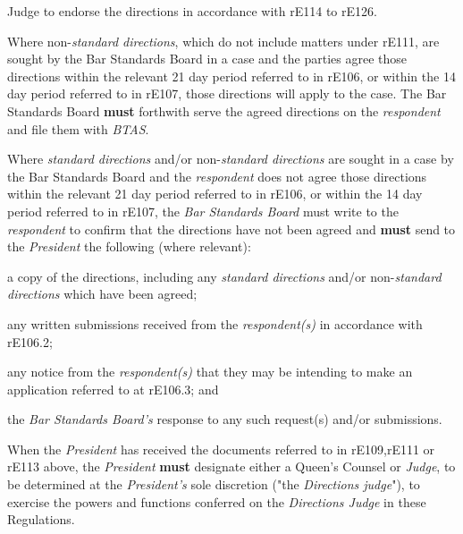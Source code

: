 Judge to endorse the directions in accordance with rE114 to rE126.\\
\par
Where non-\emph{standard directions}, which do not include matters under
rE111, are sought by the Bar Standards Board in a case and the parties
agree those directions within the relevant 21 day period referred to in
rE106, or within the 14 day period referred to in rE107, those
directions will apply to the case. The Bar Standards Board  \textcolor{myred}{\textbf{must}}
forthwith serve the agreed directions on the \emph{respondent} and file
them with \emph{BTAS}.\\
\par
{}
Where \emph{standard directions} and/or non-\emph{standard
directions} are sought in a case by the Bar Standards Board and
the \emph{respondent} does not agree those directions within the
relevant 21 day period referred to in rE106, or within the 14 day period
referred to in rE107, the \emph{Bar Standards Board }must write to
the \emph{respondent} to confirm that the directions have not been
agreed and  \textcolor{myred}{\textbf{must}} send to the \emph{President} the following (where
relevant):\\\nl \item a copy of the directions, including any \emph{standard
directions} and/or non-\emph{standard directions} which have been
agreed;\item any written submissions received from the \emph{respondent(s)} in
accordance with rE106.2;\item any notice from the \emph{respondent(s)} that they may be intending
to make an application referred to at rE106.3; and\item the \emph{Bar Standards Board's} response to any such request(s)
and/or submissions.\ln
{}\par
{}
When the \emph{President }has received the documents referred to in
rE109,rE111 or rE113 above, the \emph{President}  \textcolor{myred}{\textbf{must}} designate either a
Queen's Counsel or \emph{Judge}, to be determined at
the \emph{President's} sole discretion ("the \emph{Directions judge}"),
to exercise the powers and functions conferred on the \emph{Directions
Judge} in these Regulations.\\
\par
